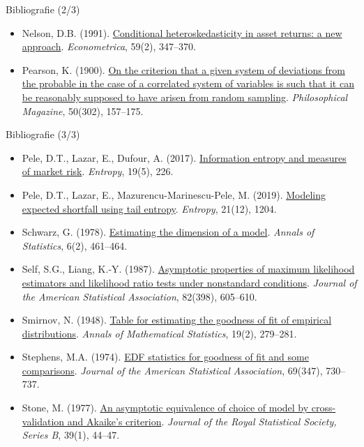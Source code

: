 \begin{frame}{Bibliografie (2/3)}
\begin{itemize}
    \item Nelson, D.B. (1991). \href{https://doi.org/10.2307/2938260}{Conditional heteroskedasticity in asset returns: a new approach}. \textit{Econometrica}, 59(2), 347--370.
    \item Pearson, K. (1900). \href{https://doi.org/10.1080/14786440009463897}{On the criterion that a given system of deviations from the probable in the case of a correlated system of variables is such that it can be reasonably supposed to have arisen from random sampling}. \textit{Philosophical Magazine}, 50(302), 157--175.
\end{itemize}
\end{frame}

\begin{frame}{Bibliografie (3/3)}
\itemsize{\tiny}
\begin{itemize}
    \item Pele, D.T., Lazar, E., Dufour, A. (2017). \href{https://doi.org/10.3390/e19050226}{Information entropy and measures of market risk}. \textit{Entropy}, 19(5), 226.
    \item Pele, D.T., Lazar, E., Mazurencu-Marinescu-Pele, M. (2019). \href{https://doi.org/10.3390/e21121204}{Modeling expected shortfall using tail entropy}. \textit{Entropy}, 21(12), 1204.
    \item Schwarz, G. (1978). \href{https://doi.org/10.1214/aos/1176344136}{Estimating the dimension of a model}. \textit{Annals of Statistics}, 6(2), 461--464.
    \item Self, S.G., Liang, K.-Y. (1987). \href{https://doi.org/10.1080/01621459.1987.10478472}{Asymptotic properties of maximum likelihood estimators and likelihood ratio tests under nonstandard conditions}. \textit{Journal of the American Statistical Association}, 82(398), 605--610.
    \item Smirnov, N. (1948). \href{https://doi.org/10.1214/aoms/1177730256}{Table for estimating the goodness of fit of empirical distributions}. \textit{Annals of Mathematical Statistics}, 19(2), 279--281.
    \item Stephens, M.A. (1974). \href{https://doi.org/10.1080/01621459.1974.10480196}{EDF statistics for goodness of fit and some comparisons}. \textit{Journal of the American Statistical Association}, 69(347), 730--737.
    \item Stone, M. (1977). \href{https://doi.org/10.1111/j.2517-6161.1977.tb01603.x}{An asymptotic equivalence of choice of model by cross-validation and Akaike's criterion}. \textit{Journal of the Royal Statistical Society, Series B}, 39(1), 44--47.

\end{itemize}
\end{frame}
